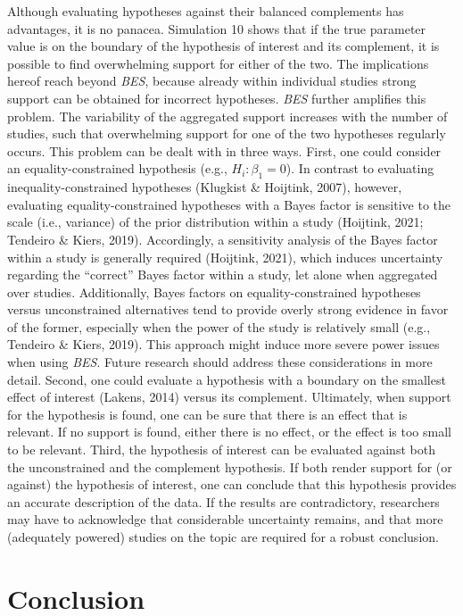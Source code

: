 \documentclass[
]{interact}
\begin{document}
Although evaluating hypotheses against their balanced complements has
advantages, it is no panacea. Simulation 10 shows that if the true
parameter value is on the boundary of the hypothesis of interest and its
complement, it is possible to find overwhelming support for either of
the two. The implications hereof reach beyond \emph{BES}, because
already within individual studies strong support can be obtained for
incorrect hypotheses. \emph{BES} further amplifies this problem. The
variability of the aggregated support increases with the number of
studies, such that overwhelming support for one of the two hypotheses
regularly occurs. This problem can be dealt with in three ways. First,
one could consider an equality-constrained hypothesis (e.g.,
\(H_i: \beta_1=0\)). In contrast to evaluating inequality-constrained
hypotheses (Klugkist \& Hoijtink, 2007), however, evaluating
equality-constrained hypotheses with a Bayes factor is sensitive to the
scale (i.e., variance) of the prior distribution within a study
(Hoijtink, 2021; Tendeiro \& Kiers, 2019). Accordingly, a sensitivity
analysis of the Bayes factor within a study is generally required
(Hoijtink, 2021), which induces uncertainty regarding the ``correct''
Bayes factor within a study, let alone when aggregated over studies.
Additionally, Bayes factors on equality-constrained hypotheses versus
unconstrained alternatives tend to provide overly strong evidence in
favor of the former, especially when the power of the study is
relatively small (e.g., Tendeiro \& Kiers, 2019). This approach might
induce more severe power issues when using \emph{BES}. Future research
should address these considerations in more detail. Second, one could
evaluate a hypothesis with a boundary on the smallest effect of interest
(Lakens, 2014) versus its complement. Ultimately, when support for the
hypothesis is found, one can be sure that there is an effect that is
relevant. If no support is found, either there is no effect, or the
effect is too small to be relevant. Third, the hypothesis of interest
can be evaluated against both the unconstrained and the complement
hypothesis. If both render support for (or against) the hypothesis of
interest, one can conclude that this hypothesis provides an accurate
description of the data. If the results are contradictory, researchers
may have to acknowledge that considerable uncertainty remains, and that
more (adequately powered) studies on the topic are required for a robust
conclusion.

\hypertarget{conclusion}{%
\section{Conclusion}\label{conclusion}}
\end{document}
